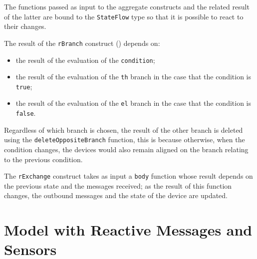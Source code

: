 The functions passed as input to the aggregate constructs and the related result of the latter are bound to the \texttt{StateFlow} type so that it is possible to react to their changes.

The result of the \texttt{rBranch} construct () depends on:
\begin{itemize}
    \item the result of the evaluation of the \texttt{condition};
    \item the result of the evaluation of the \texttt{th} branch in the case that the condition is \texttt{true};
    \item the result of the evaluation of the \texttt{el} branch in the case that the condition is \texttt{false}.
\end{itemize}

Regardless of which branch is chosen, the result of the other branch is deleted using the \texttt{deleteOppositeBranch} function, this is because otherwise, when the condition changes, the devices would also remain aligned on the branch relating to the previous condition.

The \texttt{rExchange} construct  takes as input a \texttt{body} function whose result depends on the previous state and the messages received; as the result of this function changes, the outbound messages and the state of the device are updated.









\section{Model with Reactive Messages and Sensors}


